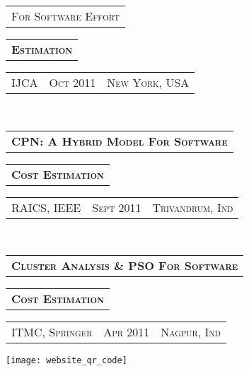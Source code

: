\documentclass[10pt,a4paper,oneside]{article}
\begin{document}
\begin{minipage}[t]{0.33\textwidth}
\begin{tabular}{c}
{            F\textsc{or} S\textsc{oftware} E\textsc{ffort}}
        \end{tabular}
        \begin{tabular}{c}
            \textbf{E\textsc{stimation}}
       \end{tabular}
        \textcolor{light-gray}{
            \begin{tabular}{c|c|c}
                \textmd{\normalsize IJCA}
                &{\small O\textsc{ct 2011}}
                &{\small N\textsc{ew} Y\textsc{ork}, USA}
            \end{tabular}
        }\\ 
        \begin{tabular}{c}
            \textbf{\normalsize CPN: A H\textsc{ybrid}
            M\textsc{odel} F\textsc{or} S\textsc{oftware}}\\
        \end{tabular}
        \begin{tabular}{c}
            \textbf{C\textsc{ost} E\textsc{stimation}}
        \end{tabular}
        \textcolor{light-gray}{
            \begin{tabular}{c|c|c}
                 {\small RAICS, IEEE}
                &{\small S\textsc{ept 2011}}
                &{\small T\textsc{rivandrum}, I\textsc{nd}}
            \end{tabular}
        }\\
        \begin{tabular}{c}
       	    \textbf{\normalsize C\textsc{luster} A\textsc{nalysis} \& PSO F\textsc{or} S\textsc{oftware}}
        \end{tabular}
        \begin{tabular}{c}
            \textbf{C\textsc{ost} E\textsc{stimation}}
        \end{tabular}
        \textcolor{light-gray}{
            \begin{tabular}{c|c|c}
                \textmd{\normalsize ITMC, S\textsc{pringer}}
                &{\small A\textsc{pr 2011}}
                &{\small N\textsc{agpur}, I\textsc{nd}}
            \end{tabular}
        }
        \begin{center}
            \texttt{[image: website\_qr\_code]}
        \end{center}
    \end{minipage}
\end{document}
